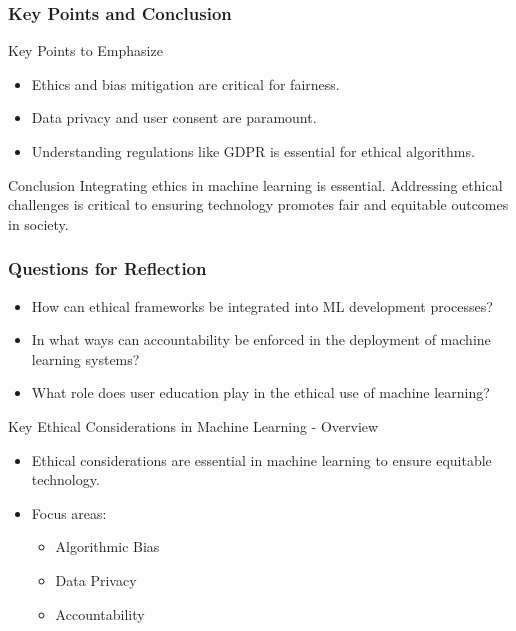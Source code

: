 \documentclass[aspectratio=169]{beamer}
\begin{document}
\begin{frame}[fragile]
    \frametitle{Key Points and Conclusion}
    \begin{block}{Key Points to Emphasize}
        \begin{itemize}
            \item Ethics and bias mitigation are critical for fairness.
            \item Data privacy and user consent are paramount.
            \item Understanding regulations like GDPR is essential for ethical algorithms.
        \end{itemize}
    \end{block}
    
    \begin{block}{Conclusion}
        Integrating ethics in machine learning is essential. Addressing ethical challenges is critical to ensuring technology promotes fair and equitable outcomes in society.
    \end{block}
\end{frame}

\begin{frame}[fragile]
    \frametitle{Questions for Reflection}
    \begin{itemize}
        \item How can ethical frameworks be integrated into ML development processes?
        \item In what ways can accountability be enforced in the deployment of machine learning systems?
        \item What role does user education play in the ethical use of machine learning?
    \end{itemize}
\end{frame}

\begin{frame}[fragile]{Key Ethical Considerations in Machine Learning - Overview}
    \begin{itemize}
        \item Ethical considerations are essential in machine learning to ensure equitable technology.
        \item Focus areas:
        \begin{itemize}
            \item Algorithmic Bias
            \item Data Privacy
            \item Accountability
        \end{itemize}
    \end{itemize}
\end{frame}
\end{document}

